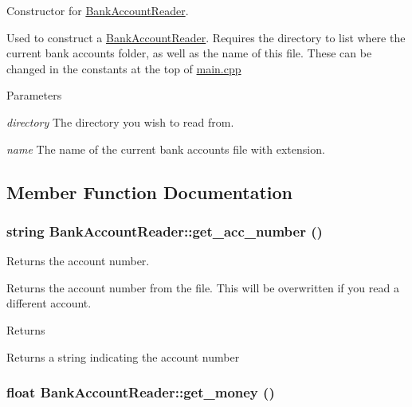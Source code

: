 Constructor for \hyperlink{classBankAccountReader}{BankAccountReader}. 

Used to construct a \hyperlink{classBankAccountReader}{BankAccountReader}. Requires the directory to list where the current bank accounts folder, as well as the name of this file. These can be changed in the constants at the top of \hyperlink{main_8cpp}{main.cpp}


\begin{DoxyParams}{Parameters}
\item[{\em directory}]The directory you wish to read from.\item[{\em name}]The name of the current bank accounts file with extension. \end{DoxyParams}


\subsection{Member Function Documentation}
\hypertarget{classBankAccountReader_a21ad21dfce6248b5ab27059954981129}{
\subsubsection[{get\_\-acc\_\-number}]{\setlength{\rightskip}{0pt plus 5cm}string BankAccountReader::get\_\-acc\_\-number ()}}
\label{classBankAccountReader_a21ad21dfce6248b5ab27059954981129}


Returns the account number. 

Returns the account number from the file. This will be overwritten if you read a different account.

\begin{DoxyReturn}{Returns}

\end{DoxyReturn}
Returns a string indicating the account number \hypertarget{classBankAccountReader_a1cffe6080d969d43af7dfdbe6f52e517}{
\subsubsection[{get\_\-money}]{\setlength{\rightskip}{0pt plus 5cm}float BankAccountReader::get\_\-money ()}}
\label{classBankAccountReader_a1cffe6080d969d43af7dfdbe6f52e517}


